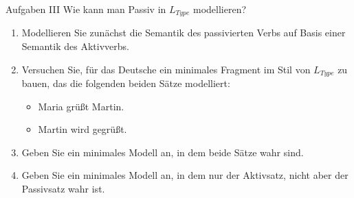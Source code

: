 \begin{frame}
  {Aufgaben III}
  Wie kann man Passiv in $L_{Type}$ modellieren?
  \Halbzeile
  \begin{enumerate}
    \item Modellieren Sie zunächst die Semantik des passivierten Verbs auf Basis einer Semantik des Aktivverbs.
    \item Versuchen Sie, für das Deutsche ein minimales Fragment im Stil von $L_{Type}$ zu bauen, das die folgenden beiden Sätze modelliert:
      \begin{itemize}[<+->]
        \item Maria grüßt Martin.
        \item Martin wird gegrüßt.
      \end{itemize}
    \item Geben Sie ein minimales Modell an, in dem beide Sätze wahr sind.
    \item Geben Sie ein minimales Modell an, in dem nur der Aktivsatz, nicht aber der Passivsatz wahr ist.
  \end{enumerate}
\end{frame}


